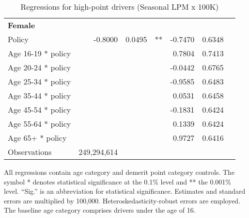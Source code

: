 \begin{table}
\begin{tabular}{l r r l r r l}
\hline 

\textbf{Female} \\ 

Policy             &  -0.8000        &  0.0495       &   **       &  -0.7470        &  0.6348       &            \\ 
Age 16-19 * policy           & & &  &  0.7804        &  0.7413       &            \\ 
Age 20-24 * policy           & & &  &  -0.0442        &  0.6765       &            \\ 
Age 25-34 * policy           & & &  &  -0.9585        &  0.6483       &            \\ 
Age 35-44 * policy           & & &  &  0.0531        &  0.6458       &            \\ 
Age 45-54 * policy           & & &  &  -0.1831        &  0.6424       &            \\ 
Age 55-64 * policy           & & &  &  0.1339        &  0.6424       &            \\ 
Age 65+ * policy           & & &  &  0.9727        &  0.6416       &            \\ 
Observations & 249,294,614 \\ 


\hline 

\end{tabular} 
\caption{Regressions for high-point drivers (Seasonal LPM x 100K)} 
All regressions contain age category and demerit point category controls. 
The symbol * denotes statistical significance at the 0.1\% level 
and ** the 0.001\% level. 
``Sig.'' is an abbreviation for statistical significance. 
Estimates and standard errors are multiplied by 100,000. 
Heteroskedasticity-robust errors are employed. 
The baseline age category comprises drivers under the age of 16. 
\label{tab:seas_LPMx100K_high_pt_regs} 
\end{table} 
 
